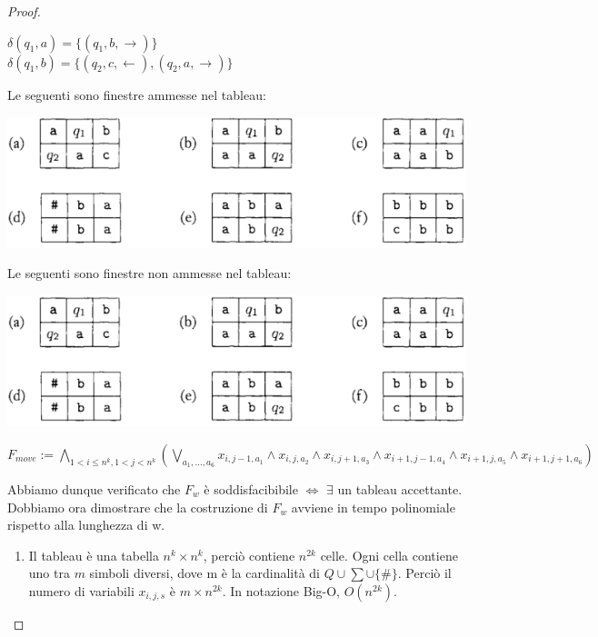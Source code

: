 \documentclass[a4paper, 12pt]{article}
\begin{document}
\begin{proof}
\begin{center}
$\delta(q_1, a) = \{(q_1,b,\rightarrow)\}$\\
$\delta(q_1, b) = \{(q_2,c,\leftarrow), (q_2,a,\rightarrow)\}$
\end{center}
Le seguenti sono finestre ammesse nel tableau:
\begin{center}
\includegraphics[scale=0.5]{finestre_tableau1.png}
\end{center}
Le seguenti sono finestre non ammesse nel tableau:
\begin{center}
\includegraphics[scale=0.5]{finestre_tableau1.png}
\end{center}
\begin{center}
$F_{move} :=  \bigwedge_{1 < i \leq n^{k}, 1 < j < n^{k}} (\bigvee_{a_1,...,a_6} x_{i,j-1,a_1} \land x_{i,j,a_2} \land x_{i,j+1,a_3} \land x_{i+1,j-1,a_4} \land x_{i+1,j,a_5} \land x_{i+1,j+1,a_6}) $
\end{center}
Abbiamo dunque verificato che $F_w$ \`e soddisfacibibile $\iff$ $\exists$ un tableau accettante. Dobbiamo ora dimostrare che la costruzione di $F_w$ avviene in tempo polinomiale rispetto alla lunghezza di w.
\begin{enumerate}
\item Il tableau \`e una tabella $n^k \times n^k$, perci\`o contiene $n^{2k}$ celle. Ogni cella contiene uno tra $m$ simboli diversi, dove m \`e la cardinalit\`a di $Q \cup \sum \cup \{\#\}$. Perci\`o il numero di  variabili $x_{i,j,s}$ \`e $m \times n^{2k}$. In notazione Big-O, $O(n^{2k})$.

\end{enumerate}
\end{proof}
\end{document}
